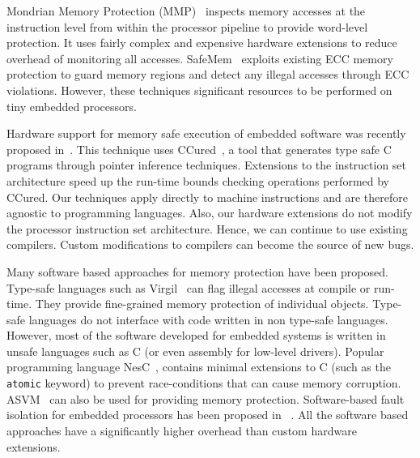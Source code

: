 %
Mondrian Memory Protection (MMP)~\cite{witchel-asplos02-mondrian} inspects memory accesses at the instruction level from within the processor pipeline to provide word-level protection.
%
It uses fairly complex and expensive hardware extensions to reduce overhead of monitoring all accesses.
%
SafeMem~\cite{qin-hpca05-safemem} exploits existing ECC memory protection to guard memory regions and detect any illegal accesses through ECC violations.
%
However, these techniques significant resources to be performed on tiny embedded processors.

%
Hardware support for memory safe execution of embedded software was recently proposed in~\cite{divya06ccured}.
%
This technique uses CCured~\cite{ccured02necula}, a tool that generates type safe C programs through pointer inference techniques.
%
Extensions to the instruction set architecture speed up the run-time bounds checking operations performed by CCured.
%
Our techniques apply directly to machine instructions and are therefore agnostic to programming languages.
%
Also, our hardware extensions do not modify the processor instruction set architecture.
%
Hence, we can continue to use existing compilers.
%
Custom modifications to compilers can become the source of new bugs.
%

Many software based approaches for memory protection have been proposed.
%
Type-safe languages such as Virgil~\cite{titzer06virgil} can flag illegal accesses at compile or run-time.
%
They provide fine-grained memory protection of individual objects.
%
Type-safe languages do not interface with code written in non type-safe languages.
%
However, most of the software developed for embedded systems is written in unsafe languages such as C (or even assembly for low-level drivers). 
%
Popular programming language NesC~\cite{gay03nesc}, contains minimal extensions to C (such as the \texttt{atomic} keyword) to prevent race-conditions that can cause memory corruption.
%
ASVM~\cite{asvm05nsdi} can also be used for providing memory protection. 
%
Software-based fault isolation for embedded processors has been proposed in ~\cite{ram07harbor}.
%
All the software based approaches have a significantly higher overhead than custom hardware extensions.
